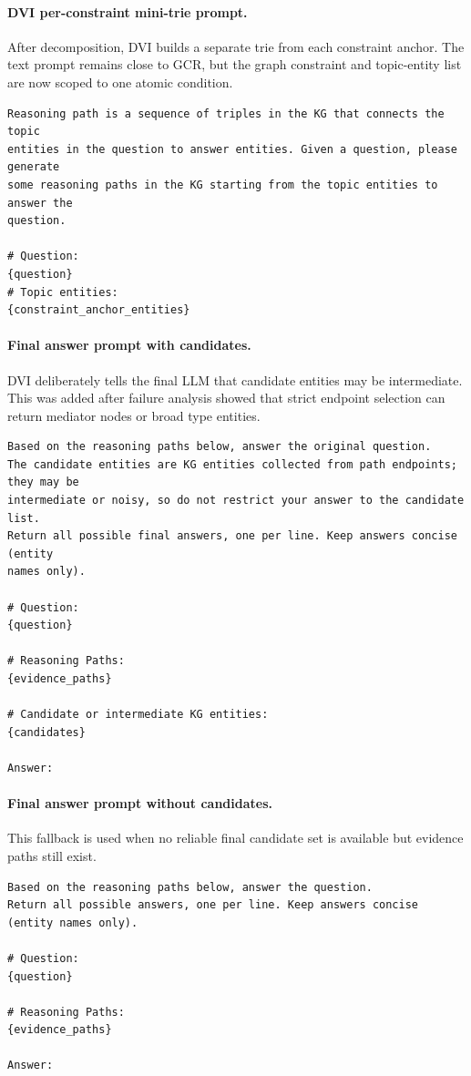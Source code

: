 \documentclass[10pt,twocolumn]{article}
\begin{document}
\paragraph{DVI per-constraint mini-trie prompt.}
After decomposition, DVI builds a separate trie from each constraint anchor. The text prompt remains close to GCR, but the graph constraint and topic-entity list are now scoped to one atomic condition.
\begin{verbatim}
Reasoning path is a sequence of triples in the KG that connects the topic
entities in the question to answer entities. Given a question, please generate
some reasoning paths in the KG starting from the topic entities to answer the
question.

# Question:
{question}
# Topic entities:
{constraint_anchor_entities}
\end{verbatim}

\paragraph{Final answer prompt with candidates.}
DVI deliberately tells the final LLM that candidate entities may be intermediate. This was added after failure analysis showed that strict endpoint selection can return mediator nodes or broad type entities.
\begin{verbatim}
Based on the reasoning paths below, answer the original question.
The candidate entities are KG entities collected from path endpoints; they may be
intermediate or noisy, so do not restrict your answer to the candidate list.
Return all possible final answers, one per line. Keep answers concise (entity
names only).

# Question:
{question}

# Reasoning Paths:
{evidence_paths}

# Candidate or intermediate KG entities:
{candidates}

Answer:
\end{verbatim}

\paragraph{Final answer prompt without candidates.}
This fallback is used when no reliable final candidate set is available but evidence paths still exist.
\begin{verbatim}
Based on the reasoning paths below, answer the question.
Return all possible answers, one per line. Keep answers concise (entity names only).

# Question:
{question}

# Reasoning Paths:
{evidence_paths}

Answer:
\end{verbatim}
\end{document}
